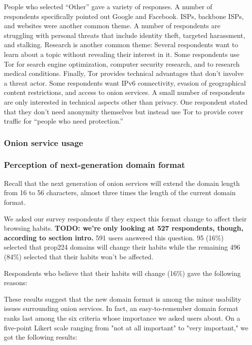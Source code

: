 People who selected ``Other'' gave a variety of responses.  A number of
respondents specifically pointed out Google and Facebook.  ISPs, backbone ISPs,
and websites were another common theme.  A number of respondents are struggling
with personal threats that include identity theft, targeted harassment, and
stalking.  Research is another common theme: Several respondents want to learn
about a topic without revealing their interest in it.  Some respondents use Tor
for search engine optimization, computer security research, and to research
medical conditions.  Finally, Tor provides technical advantages that don't
involve a threat actor.  Some respondents want IPv6 connectivity, evasion of
geographical content restrictions, and access to onion services.  A small number
of respondents are only interested in technical aspects other than privacy.  One
respondent stated that they don't need anonymity themselves but instead use Tor
to provide cover traffic for ``people who need protection.''

\subsubsection{Onion service usage}

\subsubsection{Perception of next-generation domain format}

Recall that the next generation of onion services will extend the domain length
from 16 to 56 characters, almost three times the length of the current domain
format.

We asked our survey respondents if they expect this format change to affect
their browsing habits.  \textbf{TODO: we're only looking at 527 respondents, though, according to section intro.} 591 users answered this question.  95 (16\%) selected
that prop224 domains will change their habits while the remaining 496 (84\%)
selected that their habits won't be affected.

Respondents who believe that their habits will change (16\%) gave the
following reasons:

These results suggest that the new domain format is among the
minor usability issues surrounding onion services.  In fact, an
easy-to-remember domain format ranks last among the six criteria whose
importance we asked users about.  On a five-point Likert scale ranging
from "not at all important" to "very important," we got the following
results:

